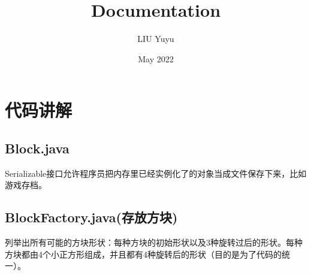\documentclass{ctexart}
\title{Documentation}
\author{LIU Yuyu}
\date{May 2022}
\begin{document}
\maketitle
\tableofcontents

\newpage
\section{代码讲解}
\subsection{Block.java}
Serializable接口允许程序员把内存里已经实例化了的对象当成文件保存下来，比如游戏存档。


\subsection{BlockFactory.java(存放方块)}
列举出所有可能的方块形状：每种方块的初始形状以及3种旋转过后的形状。每种方块都由4个小正方形组成，并且都有4种旋转后的形状（目的是为了代码的统一）。
\end{document}
